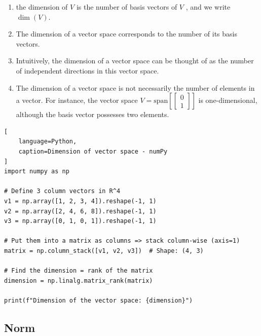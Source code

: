 \begin{enumerate}
    \item the dimension of $V$ is the number of basis vectors of $V$ , and we write $\dim(V)$.
    \hfill \cite{mfml/book/mml/Deisenroth-Faisal-Ong}

    \item The dimension of a vector space corresponds to the number of its basis vectors.
    \hfill \cite{mfml/book/mml/Deisenroth-Faisal-Ong}

    \item Intuitively, the dimension of a vector space can be thought of as the number of independent directions in this vector space.
    \hfill \cite{mfml/book/mml/Deisenroth-Faisal-Ong}

    \item The dimension of a vector space is not necessarily the number of elements in a vector. 
    For instance, the vector space $V = \text{span}[\begin{bmatrix}0 \\ 1\end{bmatrix}]$ is one-dimensional, although the basis vector possesses two elements.
    \hfill \cite{mfml/book/mml/Deisenroth-Faisal-Ong}
\end{enumerate}


\begin{lstlisting}[
    language=Python,
    caption=Dimension of vector space - numPy
]
import numpy as np

# Define 3 column vectors in R^4
v1 = np.array([1, 2, 3, 4]).reshape(-1, 1)
v2 = np.array([2, 4, 6, 8]).reshape(-1, 1)
v3 = np.array([0, 1, 0, 1]).reshape(-1, 1)

# Put them into a matrix as columns => stack column-wise (axis=1)
matrix = np.column_stack([v1, v2, v3])  # Shape: (4, 3)

# Find the dimension = rank of the matrix
dimension = np.linalg.matrix_rank(matrix)

print(f"Dimension of the vector space: {dimension}")
\end{lstlisting}












\subsection{Norm}

